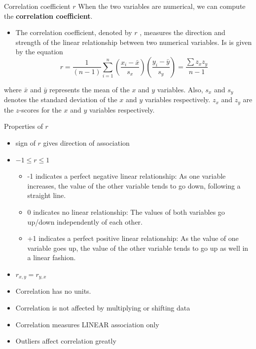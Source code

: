 \documentclass[
  ignorenonframetext,
]{beamer}
\providecommand{\tightlist}{%
  \setlength{\itemsep}{0pt}\setlength{\parskip}{0pt}}
\begin{document}
\begin{frame}{Correlation coefficient \(r\)}
\label{correlation-coefficient-r}
When the two variables are numerical, we can compute the
\textbf{correlation coefficient}.

\begin{itemize}
\tightlist
\item
  The correlation coefficient, denoted by \(r\) , measures the direction
  and strength of the linear relationship between two numerical
  variables. Is is given by the equation
  \[r=\frac{1}{(n-1)}\sum_{i=1}^n \left(\frac{x_i-\bar{x}}{s_x}\right)\left(\frac{y_i-\bar{y}}{s_y}\right)=\frac{\sum z_x z_y}{n-1}\]
\end{itemize}

where \(\bar{x}\) and \(\bar{y}\) represents the mean of the \(x\) and
\(y\) variables. Also, \(s_x\) and \(s_y\) denotes the standard
deviation of the \(x\) and \(y\) variables respectively. \(z_x\) and
\(z_y\) are the \(z\)-scores for the \(x\) and \(y\) variables
respectively.
\end{frame}

\begin{frame}{Properties of \(r\)}
\label{properties-of-r}
\begin{itemize}
\item
  sign of \(r\) gives direction of association
\item
  \(-1\leq r \leq 1\)

  \begin{itemize}
  \tightlist
  \item
    -1 indicates a perfect negative linear relationship: As one variable
    increases, the value of the other variable tends to go down,
    following a straight line.
  \item
    0 indicates no linear relationship: The values of both variables go
    up/down independently of each other.
  \item
    +1 indicates a perfect positive linear relationship: As the value of
    one variable goes up, the value of the other variable tends to go up
    as well in a linear fashion.
  \end{itemize}
\item
  \(r_{x,y}= r_{y,x}\)
\item
  Correlation has no units.
\item
  Correlation is not affected by multiplying or shifting data
\item
  Correlation measures LINEAR association only
\item
  Outliers affect correlation greatly
\end{itemize}
\end{frame}
\end{document}
